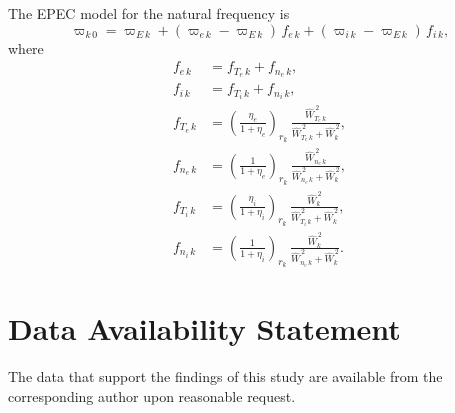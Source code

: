 \documentclass[12pt,prb,aps]{revtex4-1}
\begin{document}
The EPEC model for the natural frequency is
\begin{equation}\label{ecomp}
\varpi_{k\,0} = \varpi_{E\,k} + (\varpi_{e\,k} - \varpi_{E\,k})\,f_{e\,k} + (\varpi_{i\,k} - \varpi_{E\,k})\,f_{i\,k},
\end{equation}
where
\begin{align}
f_{e\,k}&= f_{T_e\,k}+ f_{n_e\,k},\\[0.5ex]
f_{i\,k}&= f_{T_i\,k}+ f_{n_i\,k},\\[0.5ex]
f_{T_e\,k}&=\left(\frac{\eta_e}{1+\eta_e}\right)_{r_k}\,\frac{\hat{W}_{T_e\,k}^{\,2}}{\hat{W}_{T_e\,k}^{\,2}+\hat{W}_k^{\,2}},\\[0.5ex]
f_{n_e\,k}&=\left(\frac{1}{1+\eta_e}\right)_{r_k}\,\frac{\hat{W}_{n_e\,k}^{\,2}}{\hat{W}_{n_e\,k}^{\,2}+\hat{W}_k^{\,2}},\\[0.5ex]
f_{T_i\,k}&=\left(\frac{\eta_i}{1+\eta_i}\right)_{r_k}\,\frac{\hat{W}_k^{\,2}}{\hat{W}_{T_i\,k}^{\,2}+\hat{W}_k^{\,2}},\\[0.5ex]
f_{n_i\,k}&=\left(\frac{1}{1+\eta_i}\right)_{r_k}\,\frac{\hat{W}_k^{\,2}}{\hat{W}_{n_e\,k}^{\,2}+\hat{W}_k^{\,2}}.
\end{align}


\section*{Data Availability Statement}
The data that support the findings of this study are available from the corresponding author upon reasonable request.
\end{document}
